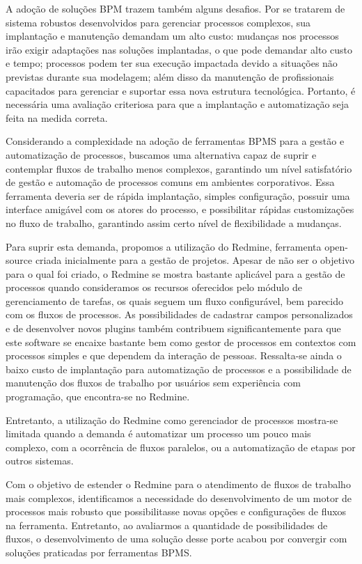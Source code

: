 A adoção de soluções BPM trazem também alguns desafios. Por se tratarem de sistema robustos desenvolvidos para gerenciar processos complexos, sua implantação e manutenção demandam um alto custo: mudanças nos processos irão exigir adaptações nas soluções implantadas, o que pode demandar alto custo e tempo; processos podem ter sua execução impactada devido a situações não previstas durante sua modelagem; além disso da manutenção de profissionais capacitados para gerenciar e suportar essa nova estrutura tecnológica. Portanto, é necessária uma avaliação criteriosa para que a implantação e automatização seja feita na medida correta.

Considerando a complexidade na adoção de ferramentas BPMS\cite{bpms} para a gestão e automatização de processos, buscamos uma alternativa capaz de suprir e contemplar fluxos de trabalho menos complexos, garantindo um nível satisfatório de gestão e automação de processos comuns em ambientes corporativos. Essa ferramenta deveria ser de rápida implantação, simples configuração, possuir uma interface amigável com os atores do processo, e possibilitar rápidas customizações no fluxo de trabalho, garantindo assim certo nível de flexibilidade a mudanças.

Para suprir esta demanda, propomos a utilização do Redmine, ferramenta open-source criada inicialmente para a gestão de projetos. Apesar de não ser o objetivo para o qual foi criado, o Redmine se mostra bastante aplicável para a gestão de processos quando consideramos os recursos oferecidos pelo módulo de gerenciamento de tarefas, os quais seguem um fluxo configurável, bem parecido com os fluxos de processos. As possibilidades de cadastrar campos personalizados e de desenvolver novos plugins também contribuem significantemente para que este software se encaixe bastante bem como gestor de processos em contextos com processos simples e que dependem da interação de pessoas. Ressalta-se ainda o baixo custo de implantação para automatização de processos e a possibilidade de manutenção dos fluxos de trabalho por usuários sem experiência com programação, que encontra-se no Redmine.

Entretanto, a utilização do Redmine como gerenciador de processos mostra-se limitada quando a demanda é automatizar um processo um pouco mais complexo, com a ocorrência de fluxos paralelos, ou a automatização de etapas por outros sistemas.

Com o objetivo de estender o Redmine para o atendimento de fluxos de trabalho mais complexos, identificamos a necessidade do desenvolvimento de um motor de processos mais robusto que possibilitasse novas opções e configurações de fluxos na ferramenta. Entretanto, ao avaliarmos a quantidade de possibilidades de fluxos, o desenvolvimento de uma solução desse porte acabou por convergir com soluções praticadas por ferramentas BPMS\cite{bpms}. 

